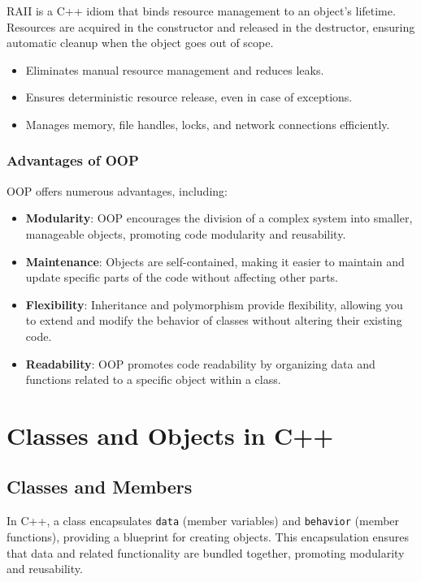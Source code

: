RAII is a C++ idiom that binds resource management to an object's lifetime. Resources are acquired in the constructor and released in the destructor, ensuring automatic cleanup when the object goes out of scope.

\begin{itemize}
    \item Eliminates manual resource management and reduces leaks.
    \item Ensures deterministic resource release, even in case of exceptions.
    \item Manages memory, file handles, locks, and network connections efficiently.
\end{itemize}

\subsubsection{Advantages of OOP}

OOP offers numerous advantages, including:

\begin{itemize}
    \item \textbf{Modularity}: OOP encourages the division of a complex system into smaller, manageable objects, promoting code modularity and reusability.
    \item \textbf{Maintenance}: Objects are self-contained, making it easier to maintain and update specific parts of the code without affecting other parts.
    \item \textbf{Flexibility}: Inheritance and polymorphism provide flexibility, allowing you to extend and modify the behavior of classes without altering their existing code.
    \item \textbf{Readability}: OOP promotes code readability by organizing data and functions related to a specific object within a class.
\end{itemize}

\newpage

\section{Classes and Objects in C++}

\subsection{Classes and Members}

In C++, a class encapsulates \texttt{data} (member variables) and \texttt{behavior} (member functions), providing a blueprint for creating objects. This encapsulation ensures that data and related functionality are bundled together, promoting modularity and reusability.

